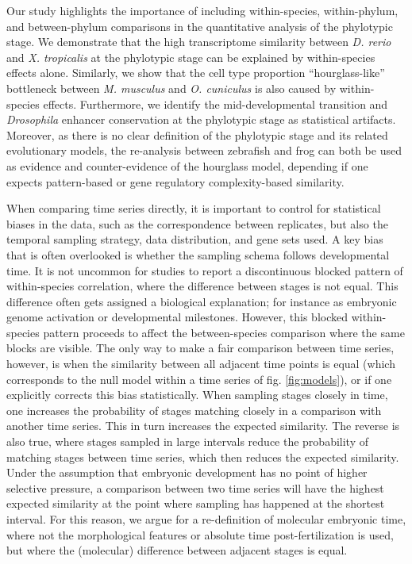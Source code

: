 Our study highlights the importance of including within-species, within-phylum, and between-phylum comparisons in the quantitative analysis of the phylotypic stage. We demonstrate that the high transcriptome similarity between \textit{D. rerio} and \textit{X. tropicalis} at the phylotypic stage\cite{marletaz2018} can be explained by within-species effects alone. Similarly, we show that the cell type proportion ``hourglass-like'' bottleneck between \textit{M. musculus} and \textit{O. cuniculus}\cite{Mayshar2023} is also caused by within-species effects. Furthermore, we identify the mid-developmental transition\cite{Levin2016} and \textit{Drosophila} enhancer conservation at the phylotypic stage\cite{Liu2021} as statistical artifacts. Moreover, as there is no clear definition of the phylotypic stage and its related evolutionary models, the re-analysis between zebrafish and frog can both be used as evidence and counter-evidence of the hourglass model, depending if one expects pattern-based or gene regulatory complexity-based similarity.

When comparing time series directly, it is important to control for statistical biases in the data, such as the correspondence between replicates, but also the temporal sampling strategy, data distribution, and gene sets used. A key bias that is often overlooked is whether the sampling schema follows developmental time\cite{BinindaEmonds2002}. It is not uncommon for studies to report a discontinuous blocked pattern of within-species correlation, where the difference between stages is not equal. This difference often gets assigned a biological explanation; for instance as embryonic genome activation\cite{Yanai2011} or developmental milestones\cite{Levin2012}. However, this blocked within-species pattern proceeds to affect the between-species comparison where the same blocks are visible. The only way to make a fair comparison between time series, however, is when the similarity between all adjacent time points is equal (which corresponds to the null model within a time series of fig. \ref{fig:models}), or if one explicitly corrects this bias statistically. When sampling stages closely in time, one increases the probability of stages matching closely in a comparison with another time series. This in turn increases the expected similarity. The reverse is also true, where stages sampled in large intervals reduce the probability of matching stages between time series, which then reduces the expected similarity. Under the assumption that embryonic development has no point of higher selective pressure, a comparison between two time series will have the highest expected similarity at the point where sampling has happened at the shortest interval. For this reason, we argue for a re-definition of molecular embryonic time, where not the morphological features or absolute time post-fertilization is used, but where the (molecular) difference between adjacent stages is equal. 

